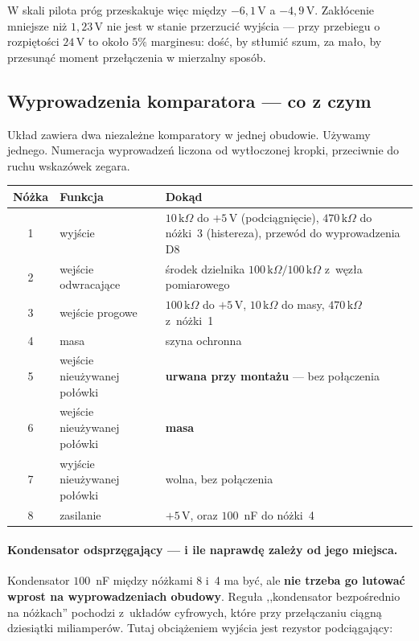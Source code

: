 \documentclass[a4paper,11pt]{article}
\newcommand{\kohm}{\,\mathrm{k}\Omega}
\newcommand{\volt}{\,\mathrm{V}}
\begin{document}
W skali pilota próg przeskakuje więc między $-6{,}1\volt$ a $-4{,}9\volt$.
Zakłócenie mniejsze niż $1{,}23\volt$ nie jest w stanie przerzucić wyjścia --- przy
przebiegu o rozpiętości $24\volt$ to około $5\%$ marginesu: dość, by stłumić szum,
za mało, by przesunąć moment przełączenia w mierzalny sposób.

\subsection{Wyprowadzenia komparatora --- co z czym}
\label{sec:nozki}

Układ zawiera dwa niezależne komparatory w jednej obudowie. Używamy jednego.
Numeracja wyprowadzeń liczona od wytłoczonej kropki, przeciwnie do ruchu wskazówek
zegara.

\begin{center}
\begin{tabular}{clp{8.6cm}}
\toprule
Nóżka & Funkcja & Dokąd \\
\midrule
1 & wyjście & $10\kohm$ do $+5\volt$ (podciągnięcie), $470\kohm$ do nóżki~3
    (histereza), przewód do wyprowadzenia D8 \\
2 & wejście odwracające & środek dzielnika $100\kohm/100\kohm$ z~węzła
    pomiarowego \\
3 & wejście progowe & $100\kohm$ do $+5\volt$, $10\kohm$ do masy, $470\kohm$
    z~nóżki~1 \\
4 & masa & szyna ochronna \\
5 & wejście nieużywanej połówki & \textbf{urwana przy montażu} --- bez połączenia \\
6 & wejście nieużywanej połówki & \textbf{masa} \\
7 & wyjście nieużywanej połówki & wolna, bez połączenia \\
8 & zasilanie & $+5\volt$, oraz $100$~nF do nóżki~4 \\
\bottomrule
\end{tabular}
\end{center}

\paragraph{Kondensator odsprzęgający --- i ile naprawdę zależy od jego miejsca.}
Kondensator $100$~nF między nóżkami 8 i~4 ma być, ale \textbf{nie trzeba go lutować
wprost na wyprowadzeniach obudowy}. Reguła ,,kondensator bezpośrednio na nóżkach''
pochodzi z~układów cyfrowych, które przy przełączaniu ciągną dziesiątki
miliamperów. Tutaj obciążeniem wyjścia jest rezystor podciągający:
\end{document}
